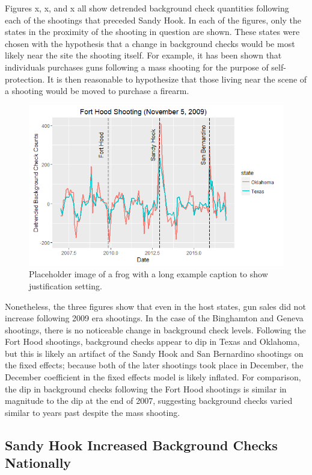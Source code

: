 \documentclass[9pt,twocolumn,twoside,lineno]{pnas-new}
\begin{document}
Figures x, x, and x all show detrended background check quantities following each of the shootings that preceded Sandy Hook. In each of the figures, only the states in the proximity of the shooting in question are shown. These states were chosen with the hypothesis that a change in background checks would be most likely near the site the shooting itself. For example, it has been shown that individuals purchases guns following a mass shooting for the purpose of self-protection. It is then reasonable to hypothesize that those living near the scene of a shooting would be moved to purchase a firearm. 
\begin{figure}
  \centering
  \includegraphics[width=\linewidth]{figures/fort-hood}
  \caption{Placeholder image of a frog with a long example caption to show justification setting.}
  \label{fig:fort-hood}
\end{figure}
Nonetheless, the three figures show that even in the host states, gun sales did not increase following 2009 era shootings. In the case of the Binghamton and Geneva shootings, there is no noticeable change in background check levels. Following the Fort Hood shootings, background checks appear to dip in Texas and Oklahoma, but this is likely an artifact of the Sandy Hook and San Bernardino shootings on the fixed effects; because both of the later shootings took place in December, the December coefficient in the fixed effects model is likely inflated. For comparison, the dip in background checks following the Fort Hood shootings is similar in magnitude to the dip at the end of 2007, suggesting background checks varied similar to years past despite the mass shooting. 

\subsection{Sandy Hook Increased Background Checks Nationally}
\end{document}

